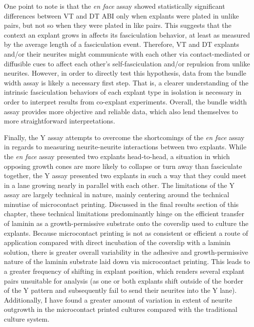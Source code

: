 One point to note is that the \emph{en face} assay showed statistically significant differences between VT and DT ABI only when explants were plated in unlike pairs, but not so when they were plated in like pairs.
This suggests that the context an explant grows in affects its fasciculation behavior, at least as measured by the average length of a fasciculation event.
Therefore, VT and DT explants and/or their neurites might communicate with each other via contact-mediated or diffusible cues to affect each other's self-fasciculation and/or repulsion from unlike neurites.
However, in order to directly test this hypothesis, data from the bundle width assay is likely a necessary first step.
That is, a clearer understanding of the intrinsic fasciculation behaviors of each explant type in isolation is necessary in order to interpret results from co-explant experiments.
Overall, the bundle width assay provides more objective and reliable data, which also lend themselves to more straightforward interpretations.

Finally, the Y assay attempts to overcome the shortcomings of the \emph{en face} assay in regards to measuring neurite-neurite interactions between two explants.
While the \emph{en face} assay presented two explants head-to-head, a situation in which opposing growth cones are more likely to collapse or turn away than fasciculate together, the Y assay presented two explants in such a way that they could meet in a lane growing nearly in parallel with each other.
The limitations of the Y assay are largely technical in nature, mainly centering around the technical minutiae of microcontact printing.
Discussed in the final results section of this chapter, these technical limitations predominantly hinge on the efficient transfer of laminin as a growth-permissive substrate onto the coverslip used to culture the explants.
Because microcontact printing is not as consistent or efficient a route of application compared with direct incubation of the coverslip with a laminin solution, there is greater overall variability in the adhesive and growth-permissive nature of the laminin substrate laid down via microcontact printing.
This leads to a greater frequency of shifting in explant position, which renders several explant pairs unsuitable for analysis (as one or both explants shift outside of the border of the Y pattern and subsequently fail to send their neurites into the Y lane).
Additionally, I have found a greater amount of variation in extent of neurite outgrowth in the microcontact printed cultures compared with the traditional culture system.

